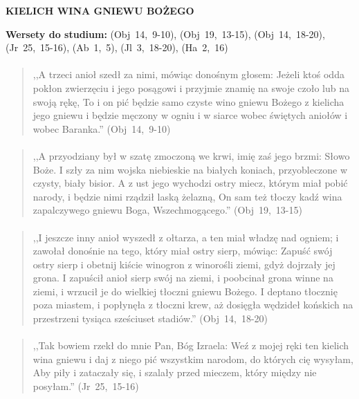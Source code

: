 \documentclass[10pt,a4paper,oneside]{article}
\begin{document}
\centerline{\textbf{\MakeUppercase{Kielich wina gniewu Bożego}}}
\begin{center}
\textbf{Wersety do studium:} 
\mbox{(Obj 14, 9-10)}, \mbox{(Obj 19, 13-15)}, \mbox{(Obj 14, 18-20)}, \mbox{(Jr 25, 15-16)}, \mbox{(Ab 1, 5)}, \mbox{(Jl 3, 18-20)}, \mbox{(Ha 2, 16)}
\end{center}
\paragraph{}
\begin{quote}
,,A trzeci anioł szedł za nimi, mówiąc donośnym głosem: Jeżeli ktoś odda pokłon zwierzęciu i jego posągowi i przyjmie znamię na swoje czoło lub na swoją rękę, To i on pić będzie samo czyste wino gniewu Bożego z kielicha jego gniewu i będzie męczony w ogniu i w siarce wobec świętych aniołów i wobec Baranka.'' \mbox{(Obj 14, 9-10)}
\end{quote}
\paragraph{}
\begin{quote}
,,A przyodziany był w szatę zmoczoną we krwi, imię zaś jego brzmi: Słowo Boże. I szły za nim wojska niebieskie na białych koniach, przyobleczone w czysty, biały bisior. A z ust jego wychodzi ostry miecz, którym miał pobić narody, i będzie nimi rządził laską żelazną, On sam też tłoczy kadź wina zapalczywego gniewu Boga, Wszechmogącego.'' \mbox{(Obj 19, 13-15)}
\end{quote}
\paragraph{}
\begin{quote}
,,I jeszcze inny anioł wyszedł z ołtarza, a ten miał władzę nad ogniem; i zawołał donośnie na tego, który miał ostry sierp, mówiąc: Zapuść swój ostry sierp i obetnij kiście winogron z winorośli ziemi, gdyż dojrzały jej grona. I zapuścił anioł sierp swój na ziemi, i poobcinał grona winne na ziemi, i wrzucił je do wielkiej tłoczni gniewu Bożego. I deptano tłocznię poza miastem, i popłynęła z tłoczni krew, aż dosięgła wędzideł końskich na przestrzeni tysiąca sześciuset stadiów.'' \mbox{(Obj 14, 18-20)}
\end{quote}
\paragraph{}
\begin{quote}
,,Tak bowiem rzekł do mnie Pan, Bóg Izraela: Weź z mojej ręki ten kielich wina gniewu i daj z niego pić wszystkim narodom, do których cię wysyłam, Aby piły i zataczały się, i szalały przed mieczem, który między nie posyłam.'' \mbox{(Jr 25, 15-16)}
\end{quote}
\end{document}
